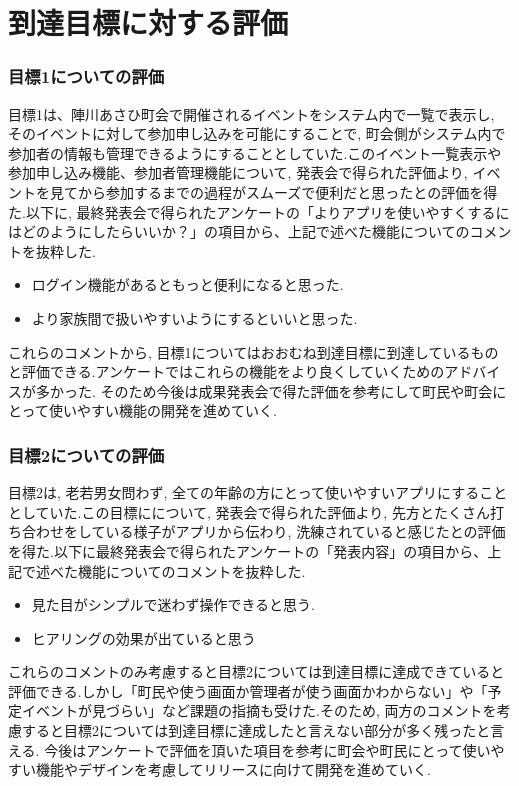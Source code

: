 \chapter{到達目標に対する評価}

\subsection{目標1についての評価}
目標1は、陣川あさひ町会で開催されるイベントをシステム内で一覧で表示し, そのイベントに対して参加申し込みを可能にすることで, 町会側がシステム内で参加者の情報も管理できるようにすることとしていた.このイベント一覧表示や参加申し込み機能、参加者管理機能について, 発表会で得られた評価より, イベントを見てから参加するまでの過程がスムーズで便利だと思ったとの評価を得た.以下に, 最終発表会で得られたアンケートの「よりアプリを使いやすくするにはどのようにしたらいいか？」の項目から、上記で述べた機能についてのコメントを抜粋した.

\begin{itemize}
    \item ログイン機能があるともっと便利になると思った.
    \item より家族間で扱いやすいようにするといいと思った.
\end{itemize}

これらのコメントから, 目標1についてはおおむね到達目標に到達しているものと評価できる.アンケートではこれらの機能をより良くしていくためのアドバイスが多かった. そのため今後は成果発表会で得た評価を参考にして町民や町会にとって使いやすい機能の開発を進めていく.

\subsection{目標2についての評価}
目標2は, 老若男女問わず, 全ての年齢の方にとって使いやすいアプリにすることとしていた.この目標にについて, 発表会で得られた評価より, 先方とたくさん打ち合わせをしている様子がアプリから伝わり, 洗練されていると感じたとの評価を得た.以下に最終発表会で得られたアンケートの「発表内容」の項目から、上記で述べた機能についてのコメントを抜粋した.

\begin{itemize}
    \item 見た目がシンプルで迷わず操作できると思う.
    \item ヒアリングの効果が出ていると思う
\end{itemize}

これらのコメントのみ考慮すると目標2については到達目標に達成できていると評価できる.しかし「町民や使う画面か管理者が使う画面かわからない」や「予定イベントが見づらい」など課題の指摘も受けた.そのため, 両方のコメントを考慮すると目標2については到達目標に達成したと言えない部分が多く残ったと言える.
今後はアンケートで評価を頂いた項目を参考に町会や町民にとって使いやすい機能やデザインを考慮してリリースに向けて開発を進めていく.
